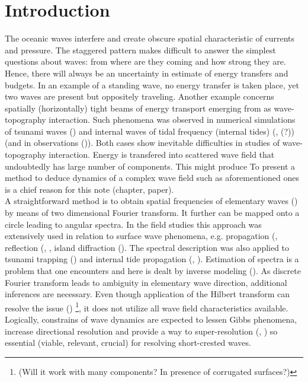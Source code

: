 \section{Introduction}
The oceanic waves interfere and create obscure spatial characteristic of currents and pressure. The 
staggered pattern makes difficult to answer the simplest questions about 
waves: from where are they coming and how strong they are. Hence, there will always be an 
uncertainty in estimate of energy transfers and budgets. In an example of a standing wave, no 
energy transfer is taken place, yet two waves are present but oppositely traveling. Another example 
concerns spatially (horizontally) tight beams of energy transport emerging from as wave-topography 
interaction. Such phenomena was observed in numerical simulations of tsunami waves 
(\cite{tang2012direct}) and internal waves of tidal frequency (internal tides) 
(\cite{simmons2004internal}, \cite{arbic2010concurrent}(?)) (and in observations 
(\cite{zhao2016global})). Both cases show inevitable difficulties in studies of wave-topography 
interaction. Energy is transfered into scattered wave field that undoubtedly has large number of 
components. This might produce  To present a method to deduce dynamics of a complex wave 
field such as aforementioned ones is a chief reason for this note (chapter, paper).\\%

A straightforward method is to obtain spatial frequencies of elementary waves (\cite{barber1963directional}) by means of two dimensional Fourier transform. It further can be mapped onto a circle leading to angular spectra. In the field studies this approach was extensively used in relation to surface wave phenomena, e.g. propagation (\cite{munk1963directional}, reflection (\cite{dickson1995wave}, \cite{thomson2005reflection}, island diffraction (\cite{pawka1983island}). The spectral description was also applied to tsunami trapping (\cite{romano2013wavenumber}) and internal tide propagation (\cite{hendry1977observations}, \cite{lozovatsky2003spatial}). Estimation of spectra is a problem that one encounters and here is dealt by inverse modeling (\cite{long1986inverse}). As discrete Fourier transform leads to ambiguity in elementary wave direction, additional inferences are necessary. Even though application of the Hilbert transform can resolve the issue (\cite{mercier2008reflection}) \footnote{(Will it work with many components? In presence of corrugated surfaces?)}, it does not utilize all wave field characteristics available. Logically, constrains of wave dynamics are expected to lessen Gibbs phenomena, increase directional resolution and provide a way to super-resolution (\cite{kay1981spectrum}, \cite{sacchi1998interpolation}) so essential (viable, relevant, crucial) for resolving short-crested waves.\\

